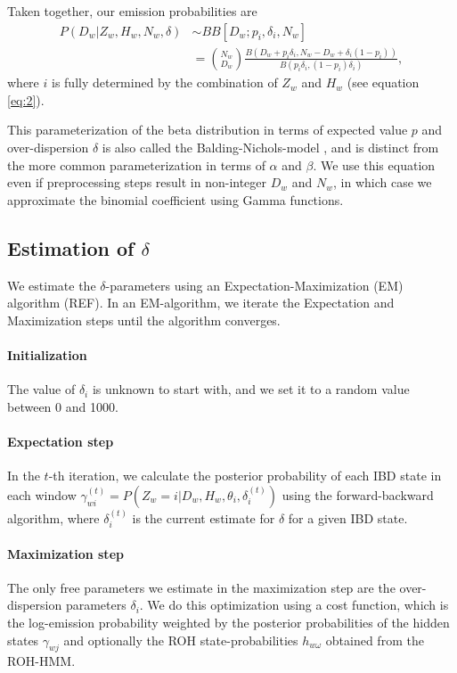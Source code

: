 \documentclass[12pt, letterpaper]{article}
\begin{document}
Taken together, our emission probabilities are 
\begin{align}\label{eq:3}
P(D_{w}|Z_w,H_w,N_w, \delta) &\sim BB[D_w; p_i, \delta_i, N_w] \nonumber\\
&= \binom{N_w}{D_w}\frac{B(D_w+p_i \delta_{i}, N_w-D_w+ \delta_{i}(1-p_{i}))}{ B(p_{i}\delta_{i}, (1-p_{i})\delta_{i})},
\end{align}
where $i$ is fully determined by the combination of $Z_w$ and $H_w$ (see equation \ref{eq:2}).

This parameterization of the beta distribution in terms of expected value $p$ and over-dispersion $\delta$ is also called the Balding-Nichols-model \cite{balding_method_nodate}, and is distinct from the more common parameterization in terms of $\alpha$ and $\beta$. We use this equation even if preprocessing steps result in non-integer $D_w$ and $N_w$, in which case we approximate the binomial coefficient using Gamma functions.   

\subsection{Estimation of $\delta$}\label{delta}
We estimate the $\delta$-parameters using an Expectation-Maximization (EM) algorithm (REF). In an EM-algorithm, we iterate the Expectation and Maximization steps until the algorithm converges.

\paragraph{Initialization}
The value of $\delta_i$ is unknown to start with, and we set it to a random value between 0 and 1000.

\paragraph{Expectation step}
In the $t$-th iteration, we calculate the posterior probability of each IBD state in each window $\gamma^{(t)}_{wi} = P(Z_w=i | D_w, H_w, \theta_i, \delta_i^{(t)})$ using the forward-backward algorithm, where $\delta_i^{(t)}$ is the current estimate for $\delta$ for a given IBD state.

\paragraph{Maximization step}
The only free parameters we estimate in the maximization step are the over-dispersion parameters $\delta_i$. We do this optimization using a cost function, which is the log-emission probability weighted by the posterior probabilities of the hidden states $\gamma_{wj}$ and optionally the ROH state-probabilities $h_{w\omega}$ obtained from the ROH-HMM.
\end{document}
